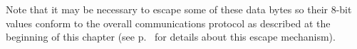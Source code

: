 \documentclass[letterpaper,twoside,onecolumn,openright,final]{memoir}
\begin{document}
Note that it may be necessary to escape some of these data bytes so their 8-bit values
conform to the overall communications protocol as described at the beginning of
this chapter (see p.~\pageref{escapebytes} for details about this escape mechanism).

\end{document}
